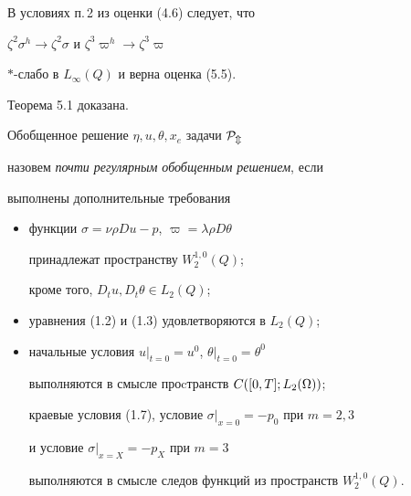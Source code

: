 В условиях п.\,2 из оценки (4.6) следует, что\quad


$\zeta^2\sigma^h\to\zeta^2\sigma$ и $\zeta^3\varpi^h\to\zeta^3\varpi$


\quad $\ast$-слабо в $L_{\infty}(Q)$ и верна оценка (5.5).


Теорема 5.1 доказана.


\medskip





Обобщенное решение $\eta,u,\theta,x_e$ задачи $\cal P_m$


назовем {\it почти регулярным обобщенным решением}, если


выполнены дополнительные требования


\begin{itemize}


\item[1)] функции $\sigma=\nu\rho Du-p$, $\varpi=\lambda\rho D\theta$


принадлежат пространству $W_2^{1,0}(Q)$;


кроме того, $D_tu, D_t\theta\in L_2(Q)$;


\item[2)] уравнения (1.2) и (1.3) удовлетворяются в $L_2(Q)$;


\item[3)] начальные условия $u|_{t=0}=u^0$, $\theta|_{t=0}=\theta^0$


выполняются в смысле проcтранств $C([0,T];\linebreak L_2(\Omega))$;


краевые условия (1.7), условие $\sigma|_{x=0}=-p_0$ при $m=2,3$


и условие $\sigma|_{x=X}=-p_X$ при $m=3$


выполняются в смысле следов функций из пространств $W_2^{1,0}(Q)$.


\end{itemize}





